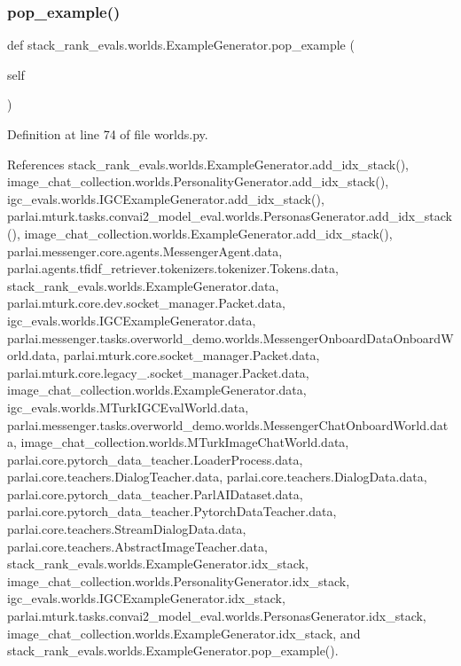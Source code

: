 \subsubsection{\texorpdfstring{pop\+\_\+example()}{pop\_example()}\hspace{0.1cm}{\footnotesize\ttfamily [2/2]}}
{\footnotesize\ttfamily def stack\+\_\+rank\+\_\+evals.\+worlds.\+Example\+Generator.\+pop\+\_\+example (\begin{DoxyParamCaption}\item[{}]{self }\end{DoxyParamCaption})}



Definition at line 74 of file worlds.\+py.



References stack\+\_\+rank\+\_\+evals.\+worlds.\+Example\+Generator.\+add\+\_\+idx\+\_\+stack(), image\+\_\+chat\+\_\+collection.\+worlds.\+Personality\+Generator.\+add\+\_\+idx\+\_\+stack(), igc\+\_\+evals.\+worlds.\+I\+G\+C\+Example\+Generator.\+add\+\_\+idx\+\_\+stack(), parlai.\+mturk.\+tasks.\+convai2\+\_\+model\+\_\+eval.\+worlds.\+Personas\+Generator.\+add\+\_\+idx\+\_\+stack(), image\+\_\+chat\+\_\+collection.\+worlds.\+Example\+Generator.\+add\+\_\+idx\+\_\+stack(), parlai.\+messenger.\+core.\+agents.\+Messenger\+Agent.\+data, parlai.\+agents.\+tfidf\+\_\+retriever.\+tokenizers.\+tokenizer.\+Tokens.\+data, stack\+\_\+rank\+\_\+evals.\+worlds.\+Example\+Generator.\+data, parlai.\+mturk.\+core.\+dev.\+socket\+\_\+manager.\+Packet.\+data, igc\+\_\+evals.\+worlds.\+I\+G\+C\+Example\+Generator.\+data, parlai.\+messenger.\+tasks.\+overworld\+\_\+demo.\+worlds.\+Messenger\+Onboard\+Data\+Onboard\+World.\+data, parlai.\+mturk.\+core.\+socket\+\_\+manager.\+Packet.\+data, parlai.\+mturk.\+core.\+legacy\+\_.\+socket\+\_\+manager.\+Packet.\+data, image\+\_\+chat\+\_\+collection.\+worlds.\+Example\+Generator.\+data, igc\+\_\+evals.\+worlds.\+M\+Turk\+I\+G\+C\+Eval\+World.\+data, parlai.\+messenger.\+tasks.\+overworld\+\_\+demo.\+worlds.\+Messenger\+Chat\+Onboard\+World.\+data, image\+\_\+chat\+\_\+collection.\+worlds.\+M\+Turk\+Image\+Chat\+World.\+data, parlai.\+core.\+pytorch\+\_\+data\+\_\+teacher.\+Loader\+Process.\+data, parlai.\+core.\+teachers.\+Dialog\+Teacher.\+data, parlai.\+core.\+teachers.\+Dialog\+Data.\+data, parlai.\+core.\+pytorch\+\_\+data\+\_\+teacher.\+Parl\+A\+I\+Dataset.\+data, parlai.\+core.\+pytorch\+\_\+data\+\_\+teacher.\+Pytorch\+Data\+Teacher.\+data, parlai.\+core.\+teachers.\+Stream\+Dialog\+Data.\+data, parlai.\+core.\+teachers.\+Abstract\+Image\+Teacher.\+data, stack\+\_\+rank\+\_\+evals.\+worlds.\+Example\+Generator.\+idx\+\_\+stack, image\+\_\+chat\+\_\+collection.\+worlds.\+Personality\+Generator.\+idx\+\_\+stack, igc\+\_\+evals.\+worlds.\+I\+G\+C\+Example\+Generator.\+idx\+\_\+stack, parlai.\+mturk.\+tasks.\+convai2\+\_\+model\+\_\+eval.\+worlds.\+Personas\+Generator.\+idx\+\_\+stack, image\+\_\+chat\+\_\+collection.\+worlds.\+Example\+Generator.\+idx\+\_\+stack, and stack\+\_\+rank\+\_\+evals.\+worlds.\+Example\+Generator.\+pop\+\_\+example().

